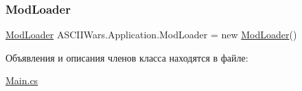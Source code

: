 \hypertarget{class_a_s_c_i_i_wars_1_1_application_ad41fb53e9ffd835c97c5f746134fbb62}{}\label{class_a_s_c_i_i_wars_1_1_application_ad41fb53e9ffd835c97c5f746134fbb62} 
\subsubsection{\texorpdfstring{Mod\+Loader}{ModLoader}}
{\footnotesize\ttfamily \hyperlink{class_a_s_c_i_i_wars_1_1_modding_1_1_mod_loader}{Mod\+Loader} A\+S\+C\+I\+I\+Wars.\+Application.\+Mod\+Loader = new \hyperlink{class_a_s_c_i_i_wars_1_1_modding_1_1_mod_loader}{Mod\+Loader}()\hspace{0.3cm}{\ttfamily [static]}}



Объявления и описания членов класса находятся в файле\+:\begin{DoxyCompactItemize}
\item 
\hyperlink{_main_8cs}{Main.\+cs}\end{DoxyCompactItemize}
